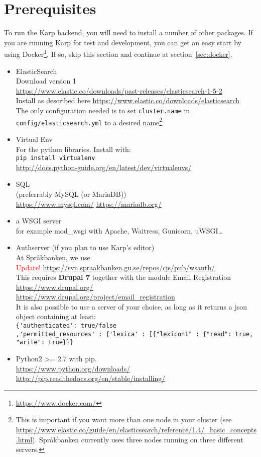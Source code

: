 \documentclass[
12pt, %
a4paper, %
oneside, %
headinclude,footinclude, %
BCOR0mm, %
]{scrartcl}
\begin{document}
\section{Prerequisites}
To run the Karp backend, you will need to install a number of other packages.
If you are running Karp for test and development, you can get an easy start by
using Docker\footnote{%
\url{https://www.docker.com/}}. If so, skip this section
and continue at section~\ref{sec:docker}.
\begin{itemize}
\item ElasticSearch \\
  Download version 1\\
  \url{https://www.elastic.co/downloads/past-releases/elasticsearch-1-5-2}\\
  Install as described here \url{https://www.elastic.co/downloads/elasticsearch}\\
  The only configuration needed is to set
  \verb|cluster.name| in \\
  \verb|config/elasticsearch.yml| to a desired name\footnote{%
    This is important if you want more than one node in your cluster (see \url{https://www.elastic.co/guide/en/elasticsearch/reference/1.4/_basic_concepts.html}).
    Språkbanken currently uses three nodes running on three different servers.}
  \item Virtual Env\\
  For the python libraries. Install with:\\
  \verb|pip install virtualenv|\\
  \url{http://docs.python-guide.org/en/latest/dev/virtualenvs/}
\item SQL \\
  (preferrably MySQL (or MariaDB))\\
  \url{https://www.mysql.com/}
  \url{https://mariadb.org/}
\item a WSGI server\\
  for example mod\_wsgi with Apache, Waitress, Gunicorn, uWSGI\ldots
\item Authserver (if you plan to use Karp's editor)\\
  At Språkbanken, we use \\
  \textcolor{red}{Update!}
  \url{https://svn.spraakbanken.gu.se/repos/cjs/pub/wsauth/}\\
  This requires \textbf{Drupal 7} together with the module Email Registration \\
  \url{https://www.drupal.org/}\\
  \url{https://www.drupal.org/project/email_registration}\\
  It is also possible to use a server of your choice, as long as it returns
  a json object containing at least: \\
   \verb|{'authenticated': true/false| \\
     \verb|,'permitted_resources' : {'lexica' : [{"lexicon1" : {"read": true, "write": true}}}|
\item Python2 >= 2.7 with pip.\\
  \url{https://www.python.org/downloads/}\\
  \url{http://pip.readthedocs.org/en/stable/installing/}
\end{itemize}
\end{document}
